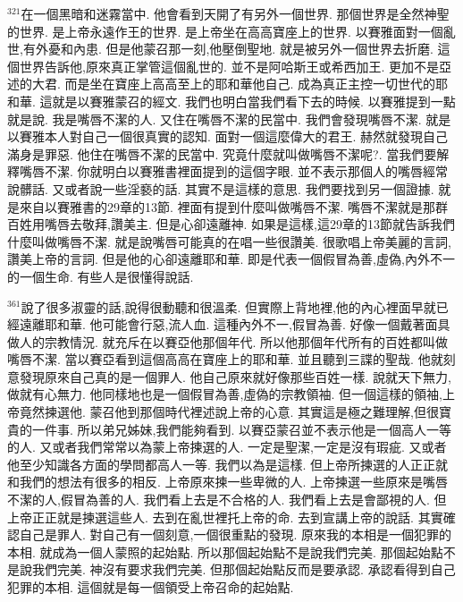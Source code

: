 \documentclass{book}
\begin{document}
$^{321}$在一個黑暗和迷霧當中.
他會看到天開了有另外一個世界.
那個世界是全然神聖的世界.
是上帝永遠作王的世界.
是上帝坐在高高寶座上的世界.
以賽雅面對一個亂世,有外憂和內患.
但是他蒙召那一刻,他壓倒聖地.
就是被另外一個世界去折磨.
這個世界告訴他,原來真正掌管這個亂世的.
並不是阿哈斯王或希西加王.
更加不是亞述的大君.
而是坐在寶座上高高至上的耶和華他自己.
成為真正主控一切世代的耶和華.
這就是以賽雅蒙召的經文.
我們也明白當我們看下去的時候.
以賽雅提到一點就是說.
我是嘴唇不潔的人.
又住在嘴唇不潔的民當中.
我們會發現嘴唇不潔.
就是以賽雅本人對自己一個很真實的認知.
面對一個這麼偉大的君王.
赫然就發現自己滿身是罪惡.
他住在嘴唇不潔的民當中.
究竟什麼就叫做嘴唇不潔呢?.
當我們要解釋嘴唇不潔.
你就明白以賽雅書裡面提到的這個字眼.
並不表示那個人的嘴唇經常說髒話.
又或者說一些淫褻的話.
其實不是這樣的意思.
我們要找到另一個證據.
就是來自以賽雅書的29章的13節.
裡面有提到什麼叫做嘴唇不潔.
嘴唇不潔就是那群百姓用嘴唇去敬拜,讚美主.
但是心卻遠離神.
如果是這樣,這29章的13節就告訴我們什麼叫做嘴唇不潔.
就是說嘴唇可能真的在唱一些很讚美.
很歌唱上帝美麗的言詞,讚美上帝的言詞.
但是他的心卻遠離耶和華.
即是代表一個假冒為善,虛偽,內外不一的一個生命.
有些人是很懂得說話.

$^{361}$說了很多淑靈的話,說得很動聽和很溫柔.
但實際上背地裡,他的內心裡面早就已經遠離耶和華.
他可能會行惡,流人血.
這種內外不一,假冒為善.
好像一個戴著面具做人的宗教情況.
就充斥在以賽亞他那個年代.
所以他那個年代所有的百姓都叫做嘴唇不潔.
當以賽亞看到這個高高在寶座上的耶和華.
並且聽到三諜的聖哉.
他就刻意發現原來自己真的是一個罪人.
他自己原來就好像那些百姓一樣.
說就天下無力,做就有心無力.
他同樣地也是一個假冒為善,虛偽的宗教領袖.
但一個這樣的領袖,上帝竟然揀選他.
蒙召他到那個時代裡述說上帝的心意.
其實這是極之難理解,但很寶貴的一件事.
所以弟兄姊妹,我們能夠看到.
以賽亞蒙召並不表示他是一個高人一等的人.
又或者我們常常以為蒙上帝揀選的人.
一定是聖潔,一定是沒有瑕疵.
又或者他至少知識各方面的學問都高人一等.
我們以為是這樣.
但上帝所揀選的人正正就和我們的想法有很多的相反.
上帝原來揀一些卑微的人.
上帝揀選一些原來是嘴唇不潔的人,假冒為善的人.
我們看上去是不合格的人.
我們看上去是會鄙視的人.
但上帝正正就是揀選這些人.
去到在亂世裡托上帝的命.
去到宣講上帝的說話.
其實確認自己是罪人.
對自己有一個刻意,一個很重點的發現.
原來我的本相是一個犯罪的本相.
就成為一個人蒙照的起始點.
所以那個起始點不是說我們完美.
那個起始點不是說我們完美.
神沒有要求我們完美.
但那個起始點反而是要承認.
承認看得到自己犯罪的本相.
這個就是每一個領受上帝召命的起始點.
\end{document}
